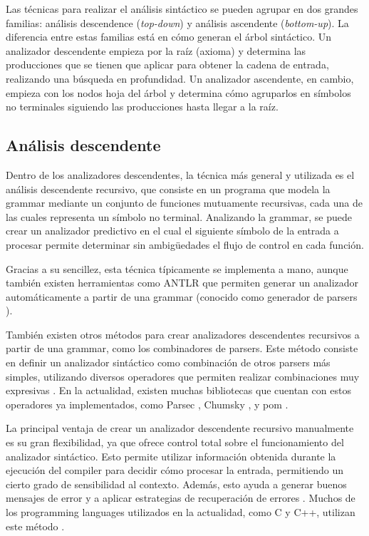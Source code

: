 Las técnicas para realizar el análisis sintáctico se pueden agrupar en dos
grandes familias: análisis descendence (\textit{top-down}) y análisis ascendente
(\textit{bottom-up}). La diferencia entre estas familias está en cómo generan el
árbol sintáctico. Un analizador descendente empieza por la raíz (axioma) y
determina las producciones que se tienen que aplicar para obtener la cadena de
entrada, realizando una búsqueda en profundidad. Un analizador ascendente, en
cambio, empieza con los nodos hoja del árbol y determina cómo agruparlos en
símbolos no terminales siguiendo las producciones hasta llegar a la raíz.
\parencite{dragon-book}

\subsection{Análisis descendente}

Dentro de los analizadores descendentes, la técnica más general y utilizada es
el análisis descendente recursivo, que consiste en un programa que modela la
\gls{grammar} mediante un conjunto de funciones mutuamente recursivas, cada una
de las cuales representa un símbolo no terminal. Analizando la \gls{grammar}, se
puede crear un analizador predictivo en el cual el siguiente símbolo de la
entrada a procesar permite determinar sin ambigüedades el flujo de control en
cada función. \parencite{dragon-book}

Gracias a su sencillez, esta técnica típicamente se implementa a mano, aunque
también existen herramientas como ANTLR \parencite{ANTLR} que permiten generar
un analizador automáticamente a partir de una \gls{grammar} (conocido como
generador de \glspl{parser} \parencite{dragon-book}).

También existen otros métodos para crear analizadores descendentes
recursivos a partir de una \gls{grammar}, como los combinadores de
\glspl{parser}. Este método consiste en definir un analizador sintáctico como
combinación de otros \glspl{parser} más simples, utilizando diversos operadores
que permiten realizar combinaciones muy expresivas
\parencite{parser-combinators}. En la actualidad, existen muchas bibliotecas que
cuentan con estos operadores ya implementados, como Parsec \parencite{parsec}, Chumsky
\parencite{chumsky}, y pom \parencite{pom}.

La principal ventaja de crear un analizador descendente recursivo manualmente es su
gran flexibilidad, ya que ofrece control total sobre el funcionamiento del
analizador sintáctico. Esto permite utilizar información obtenida durante la
ejecución del \gls{compiler} para decidir cómo procesar la entrada, permitiendo
un cierto grado de sensibilidad al contexto. Además, esto ayuda a generar buenos
mensajes de error y a aplicar estrategias de recuperación de errores
\parencite{errors-clang}. Muchos de los \glspl{programming language} utilizados
en la actualidad, como C y C++, utilizan este método
\parencite{parser-types-survey}.

